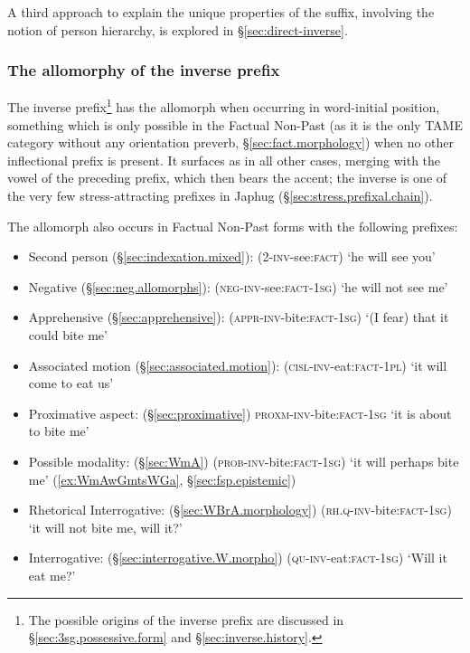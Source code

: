 A third approach to explain the unique properties of the  suffix, involving the notion of person hierarchy, is explored in §\ref{sec:direct-inverse}.

\subsubsection{The allomorphy of the inverse prefix} \label{sec:allomorphy.inv}
The inverse prefix\footnote{The possible origins of the inverse prefix are discussed in §\ref{sec:3sg.possessive.form} and §\ref{sec:inverse.history}.} has the allomorph  when occurring in word-initial position, something which is only possible in the Factual Non-Past (as it is the only TAME category without any orientation preverb, §\ref{sec:fact.morphology}) when no other inflectional prefix is present. It surfaces as  in all other cases, merging with the vowel of the preceding prefix, which then bears the accent; the inverse is one of the very few stress-attracting prefixes in Japhug (§\ref{sec:stress.prefixal.chain}).

The allomorph  also occurs in Factual Non-Past forms with the following prefixes:

\begin{itemize}
	\item Second person  (§\ref{sec:indexation.mixed}):  (2-\textsc{inv}-see:\textsc{fact}) `he will see you'
	\item Negative  (§\ref{sec:neg.allomorphs}):  (\textsc{neg}-\textsc{inv}-see:\textsc{fact}-\textsc{1sg}) `he will not see me'
	\item Apprehensive  (§\ref{sec:apprehensive}):  (\textsc{appr}-\textsc{inv}-bite:\textsc{fact}-\textsc{1sg}) `(I fear) that it could bite me'
	\item Associated motion  (§\ref{sec:associated.motion}):  (\textsc{cisl}-\textsc{inv}-eat:\textsc{fact}-\textsc{1pl}) `it will come to eat us'
	\item Proximative aspect:  (§\ref{sec:proximative})  \textsc{proxm}-\textsc{inv}-bite:\textsc{fact}-\textsc{1sg} `it is about to bite me'
	\item Possible modality:  (§\ref{sec:WmA})  (\textsc{prob}-\textsc{inv}-bite:\textsc{fact}-\textsc{1sg}) `it will perhaps bite me' (\ref{ex:WmAwGmtsWGa}, §\ref{sec:fsp.epistemic})
	\item Rhetorical Interrogative:  (§\ref{sec:WBrA.morphology})  (\textsc{rh}.\textsc{q}-\textsc{inv}-bite:\textsc{fact}-\textsc{1sg}) `it will not bite me, will it?'
	\item Interrogative:  (§\ref{sec:interrogative.W.morpho})  (\textsc{qu}-\textsc{inv}-eat:\textsc{fact}-\textsc{1sg}) `Will it eat me?'
\end{itemize}


